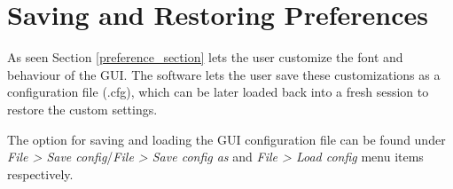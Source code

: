 \section{Saving and Restoring Preferences}
As seen Section \ref{preference_section} lets the user customize the font and behaviour of the GUI. The software lets the user save these customizations as a configuration file (.cfg), which can be later loaded back into a fresh session to restore the custom settings.

The option for saving and loading the GUI configuration file can be found under \textit{File > Save config}/\textit{File > Save config as} and \textit{File > Load config }menu items respectively.

%
%


%
%
%
%
%




